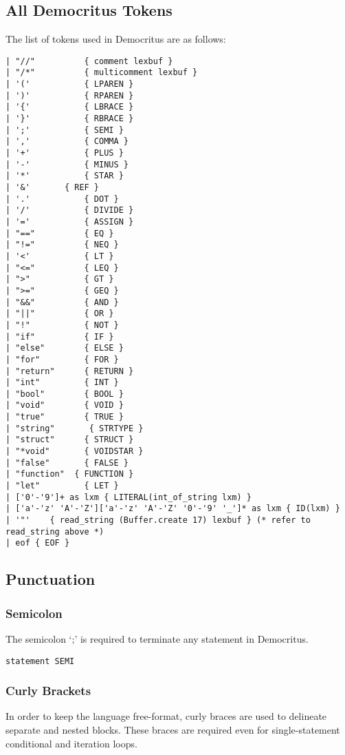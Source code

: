 	\subsection{All Democritus Tokens}
		The list of tokens used in Democritus are as follows:

		\begin{verbatim}
| "//"     		{ comment lexbuf }             	
| "/*"     		{ multicomment lexbuf }          
| '('      		{ LPAREN }
| ')'      		{ RPAREN }
| '{'      		{ LBRACE }
| '}'      		{ RBRACE }
| ';'      		{ SEMI }
| ','      		{ COMMA }
| '+'      		{ PLUS }
| '-'      		{ MINUS }
| '*'      		{ STAR }
| '&'       { REF }
| '.'      		{ DOT }
| '/'      		{ DIVIDE }
| '='      		{ ASSIGN }
| "=="     		{ EQ }
| "!="     		{ NEQ }
| '<'      		{ LT }
| "<="     		{ LEQ }
| ">"      		{ GT }
| ">="     		{ GEQ }
| "&&"     		{ AND }
| "||"     		{ OR }
| "!"      		{ NOT }
| "if"     		{ IF }
| "else"   		{ ELSE }
| "for"    		{ FOR }
| "return" 		{ RETURN }
| "int"    		{ INT }
| "bool"   		{ BOOL }
| "void"   		{ VOID }
| "true"   		{ TRUE }
| "string"		 { STRTYPE }
| "struct" 		{ STRUCT }
| "*void"  		{ VOIDSTAR }
| "false"  		{ FALSE }
| "function"  { FUNCTION }
| "let"      	{ LET }
| ['0'-'9']+ as lxm { LITERAL(int_of_string lxm) }
| ['a'-'z' 'A'-'Z']['a'-'z' 'A'-'Z' '0'-'9' '_']* as lxm { ID(lxm) }
| '"'    { read_string (Buffer.create 17) lexbuf } (* refer to read_string above *)
| eof { EOF }
\end{verbatim}
		

	\subsection{Punctuation}
		\subsubsection{Semicolon}
			The semicolon `;' is required to terminate any statement in Democritus. 
			
			\begin{verbatim}
statement SEMI
			\end{verbatim}
			
		\subsubsection{Curly Brackets}
			In order to keep the language free-format, curly braces are used to delineate separate and nested blocks. These braces are required even for single-statement conditional and iteration loops.
			
